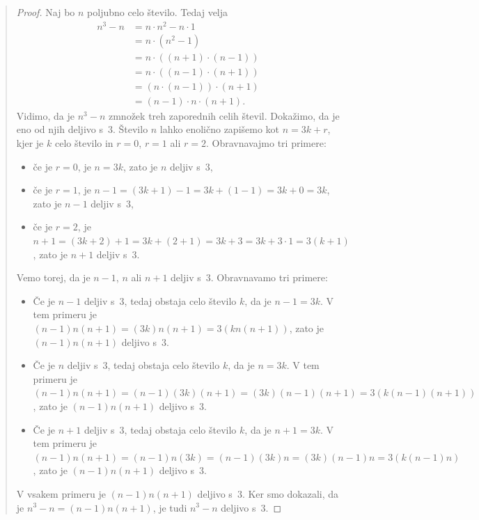 \begin{quote}
  \begin{proof}
    Naj bo $n$ poljubno celo število. Tedaj velja
    \begin{align*}
      n^3 - n
      &= n \cdot n^2 - n \cdot 1 \\
      &= n \cdot (n^2 - 1) \\
      &= n \cdot ((n + 1) \cdot (n - 1)) \\
      &= n \cdot ((n - 1) \cdot (n + 1)) \\
      &= (n \cdot (n - 1)) \cdot (n + 1) \\
      &= (n - 1) \cdot n \cdot (n + 1).
    \end{align*}
    Vidimo, da je $n^3 - n$ zmnožek treh zaporednih celih števil.
    Dokažimo, da je eno od njih deljivo s~$3$. Število $n$ lahko
    enolično zapišemo kot $n = 3 k + r$, kjer je $k$ celo število
    in $r = 0$, $r = 1$ ali $r = 2$. Obravnavajmo tri primere:
    \begin{itemize}
    \item če je $r = 0$, je $n = 3 k$, zato je $n$ deljiv s~$3$,
    \item če je $r = 1$, je $n - 1 = (3 k + 1) - 1 = 3 k + (1 - 1) = 3
      k + 0 = 3 k$, zato je $n-1$ deljiv s~$3$,
    \item če je $r = 2$, je $n + 1 = (3 k + 2) + 1 = 3 k + (2 + 1) = 3
      k + 3 = 3 k + 3 \cdot 1 = 3 (k +1)$, zato je $n+1$ deljiv s~$3$.
    \end{itemize}
    Vemo torej, da je $n - 1$, $n$ ali $n + 1$ deljiv s~$3$.
    Obravnavamo tri primere:
    \begin{itemize}
    \item Če je $n - 1$ deljiv s~$3$, tedaj obstaja celo število
      $k$, da je $n - 1 = 3 k$. V tem primeru je $(n - 1) n (n + 1) =
      (3 k) n (n + 1) = 3 (k n (n + 1))$, zato je $(n - 1) n (n + 1)$
      deljivo s~$3$.
    \item Če je $n$ deljiv s~$3$, tedaj obstaja celo število $k$,
      da je $n = 3 k$. V tem primeru je $(n - 1) n (n + 1) = (n - 1)
      (3 k) (n + 1) = (3 k) (n - 1) (n + 1) = 3 (k (n - 1) (n +
      1))$, zato je $(n - 1) n (n + 1)$ deljivo s~$3$.
    \item Če je $n + 1$ deljiv s~$3$, tedaj obstaja celo število
      $k$, da je $n + 1 = 3 k$. V tem primeru je $(n - 1) n (n + 1) =
      (n - 1) n (3 k) = (n - 1) (3 k) n = (3 k) (n - 1) n = 3 (k (n -
      1) n)$, zato je $(n - 1) n (n + 1)$ deljivo s~$3$.
    \end{itemize}
    V vsakem primeru je $(n - 1) n (n + 1)$ deljivo s~$3$. Ker smo
    dokazali, da je $n^3 - n = (n - 1) n (n + 1)$, je tudi $n^3 - n$
    deljivo s~$3$.
  \end{proof}
\end{quote}


